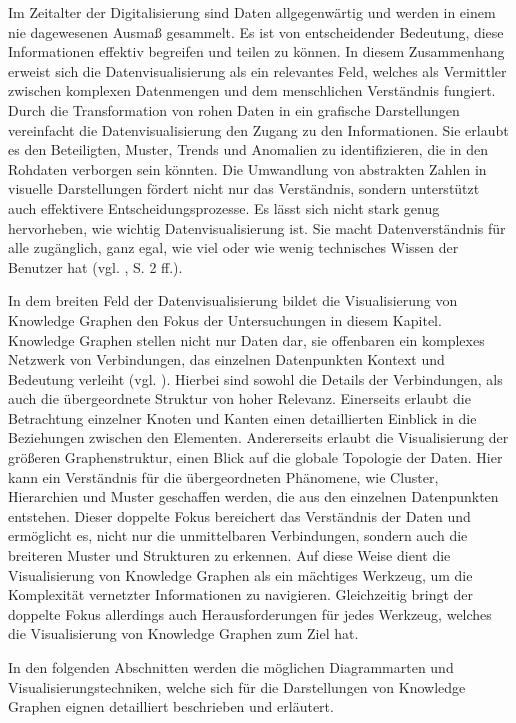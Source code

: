 Im Zeitalter der Digitalisierung sind Daten allgegenwärtig und werden in einem nie dagewesenen Ausmaß gesammelt. Es ist von entscheidender Bedeutung, diese Informationen effektiv begreifen und teilen zu können. In diesem Zusammenhang erweist sich die Datenvisualisierung als ein relevantes Feld, welches als Vermittler zwischen komplexen Datenmengen und dem menschlichen Verständnis fungiert. Durch die Transformation von rohen Daten in ein grafische Darstellungen vereinfacht die Datenvisualisierung den Zugang zu den Informationen. Sie erlaubt es den Beteiligten, Muster, Trends und Anomalien zu identifizieren, die in den Rohdaten verborgen sein könnten. Die Umwandlung von abstrakten Zahlen in visuelle Darstellungen fördert nicht nur das Verständnis, sondern unterstützt auch effektivere Entscheidungsprozesse. Es lässt sich nicht stark genug hervorheben, wie wichtig Datenvisualisierung ist. Sie macht Datenverständnis für alle zugänglich, ganz egal, wie viel oder wie wenig technisches Wissen der Benutzer hat (vgl. \cite{unwin:WhyDataVisualization}, S. 2 ff.).

In dem breiten Feld der Datenvisualisierung bildet die Visualisierung von Knowledge Graphen den Fokus der Untersuchungen in diesem Kapitel. Knowledge Graphen stellen nicht nur Daten dar, sie offenbaren ein komplexes Netzwerk von Verbindungen, das einzelnen Datenpunkten Kontext und Bedeutung verleiht (vgl. \cite{knowledgeGraph:whatIs}). Hierbei sind sowohl die Details der Verbindungen, als auch die übergeordnete Struktur von hoher Relevanz. Einerseits erlaubt die Betrachtung einzelner Knoten und Kanten einen detaillierten Einblick in die Beziehungen zwischen den Elementen. Andererseits erlaubt die Visualisierung der größeren Graphenstruktur, einen Blick auf die globale Topologie der Daten. Hier kann ein Verständnis für die übergeordneten Phänomene, wie Cluster, Hierarchien und Muster geschaffen werden, die aus den einzelnen Datenpunkten entstehen. Dieser doppelte Fokus bereichert das Verständnis der Daten und ermöglicht es, nicht nur die unmittelbaren Verbindungen, sondern auch die breiteren Muster und Strukturen zu erkennen. Auf diese Weise dient die Visualisierung von Knowledge Graphen als ein mächtiges Werkzeug, um die Komplexität vernetzter Informationen zu navigieren. Gleichzeitig bringt der doppelte Fokus allerdings auch Herausforderungen für jedes Werkzeug, welches die Visualisierung von Knowledge Graphen zum Ziel hat.

In den folgenden Abschnitten werden die möglichen Diagrammarten und Visualisierungstechniken, welche sich für die Darstellungen von Knowledge Graphen eignen detailliert beschrieben und erläutert.

